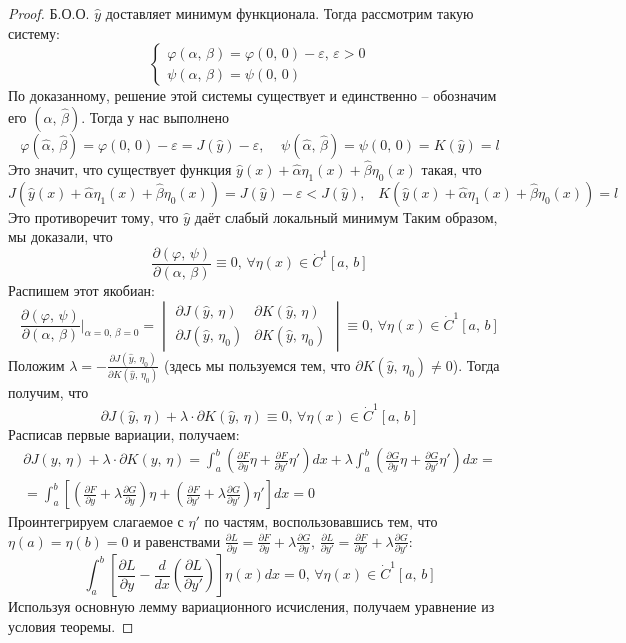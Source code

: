 \documentclass[a4paper,12pt]{article}
\renewcommand{\phi}{\ensuremath{\varphi}}
\theoremstyle{plain}
\theoremstyle{definition}
\theoremstyle{remark}
\begin{document}
\begin{proof}
	Б.О.О. $\hat{y}$ доставляет минимум функционала. Тогда рассмотрим такую систему:
	\[
		\begin{cases}
			\phi(\alpha,\,\beta) = \phi(0,\,0) - \varepsilon,\, \varepsilon > 0 \\
			\psi(\alpha,\,\beta) = \psi(0,\,0)
		\end{cases}
	\]
	По доказанному, решение этой системы существует и единственно -- обозначим его $(\hat{\alpha},\, \hat{\beta})$. Тогда у нас выполнено
	\[\phi(\hat{\alpha},\, \hat{\beta}) = \phi(0,\,0) - \varepsilon = J(\hat{y}) - \varepsilon,\;\;\;\; \psi(\hat{\alpha},\,\hat{\beta}) = \psi(0,\,0) = K(\hat{y}) = l\]
	Это значит, что существует функция $\hat{y}(x) + \hat{\alpha}\eta_1(x) + \hat{\beta}\eta_0(x)$ такая, что
	\[J(\hat{y}(x) + \hat{\alpha}\eta_1(x) + \hat{\beta}\eta_0(x)) = J(\hat{y}) - \varepsilon < J(\hat{y}),\;\;\; K(\hat{y}(x) + \hat{\alpha}\eta_1(x) + \hat{\beta}\eta_0(x)) = l\]
	Это противоречит тому, что $\hat{y}$ даёт слабый локальный минимум Таким образом, мы доказали, что
	\[\frac{\partial(\phi,\, \psi)}{\partial(\alpha,\, \beta)} \equiv 0,\, \forall \eta(x) \in \dot{C}^1[a,\,b]\]
	Распишем этот якобиан:
	\[\frac{\partial(\phi,\, \psi)}{\partial(\alpha,\, \beta)}|_{\alpha = 0,\, \beta = 0} = \begin{vmatrix}
			\partial J(\hat{y},\,\eta)   & \partial K(\hat{y},\,\eta)   \\
			\partial J(\hat{y},\,\eta_0) & \partial K(\hat{y},\,\eta_0)
		\end{vmatrix} \equiv 0,\, \forall \eta(x) \in \dot{C}^1[a,\,b]\]
	Положим $\lambda = -\frac{\partial J(\hat{y},\,\eta_0)}{\partial K(\hat{y},\, \eta_0)}$ (здесь мы пользуемся тем, что $\partial K(\hat{y},\, \eta_0) \neq 0$). Тогда получим, что
	\[\partial J(\hat{y},\,\eta) + \lambda\cdot\partial K(\hat{y},\, \eta) \equiv 0,\, \forall \eta(x) \in \dot{C}^1[a,\,b]\]
	Расписав первые вариации, получаем:
	\begin{align*}
		\partial J(y,\,\eta) + \lambda\cdot\partial K(y,\, \eta) = \int_a^b \left(\frac{\partial F}{\partial y}\eta + \frac{\partial F}{\partial y'}\eta'\right)dx + \lambda\int_a^b\left(\frac{\partial G}{\partial y}\eta + \frac{\partial G}{\partial y'}\eta'\right)dx = \\
		= \int_a^b \left[\left(\frac{\partial F}{\partial y} + \lambda\frac{\partial G}{\partial y}\right)\eta + \left(\frac{\partial F}{\partial y'} + \lambda\frac{\partial G}{\partial y'}\right)\eta'\right]dx = 0
	\end{align*}
	Проинтегрируем слагаемое с $\eta'$ по частям, воспользовавшись тем, что $\eta(a) = \eta(b) = 0$ и равенствами $\frac{\partial L}{\partial y} = \frac{\partial F}{\partial y} + \lambda\frac{\partial G}{\partial y},\, \frac{\partial L}{\partial y'} = \frac{\partial F}{\partial y'} + \lambda\frac{\partial G}{\partial y'}$:
	\[\int_a^b \left[\frac{\partial L}{\partial y} - \frac{d}{dx}\left(\frac{\partial L}{\partial y'}\right)\right]\eta(x)dx = 0,\, \forall \eta(x) \in \dot{C}^1[a,\,b]\]
	Используя основную лемму вариационного исчисления, получаем уравнение из условия теоремы.
\end{proof}
\end{document}
